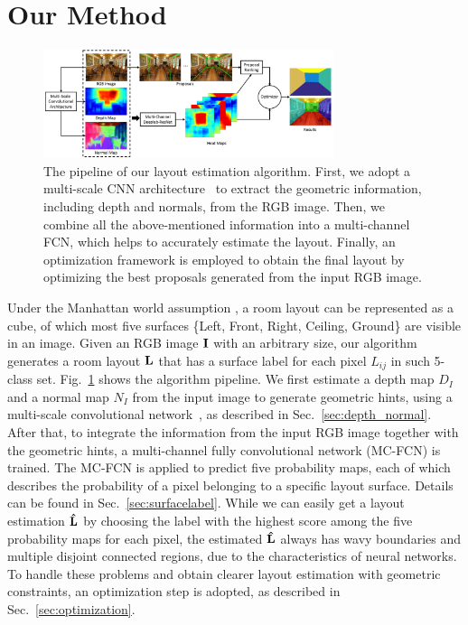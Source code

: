 \section{Our Method}
\label{sec:Meth}

 

\begin{figure}[!ht]
	\centering
	\includegraphics[width=8.5cm]{figure/ppline.png}
	\caption{The pipeline of our layout estimation algorithm. First, we adopt a multi-scale CNN architecture~\cite{eigen2015predicting} to extract the geometric information, including depth and normals, from the RGB image. Then, we combine all the above-mentioned information into a multi-channel FCN, which helps to accurately estimate the layout. Finally, an optimization framework is employed to obtain the final layout by optimizing the best proposals generated from the input RGB image.}
	\label{fig:pipeline}
\end{figure}

Under the Manhattan world assumption \cite{coughlan1999manhattan}, a room layout can be represented as a cube, of which most five surfaces \{Left, Front, Right, Ceiling, Ground\} are visible in an image. 
%
Given an RGB image $\mathbf{I}$ with an arbitrary size, our algorithm generates a room layout $\mathbf{L}$ that has a surface label for each pixel $L_{ij}$ in such 5-class set. Fig.~\ref{fig:pipeline} shows the algorithm pipeline. 
We first estimate a depth map $D_{I}$ and a normal map $N_{I}$ from the input image to generate geometric hints, using a multi-scale convolutional network~\cite{eigen2015predicting}, as described in Sec.~\ref{sec:depth_normal}.
After that, to integrate the information from the input RGB image together with the geometric hints, a multi-channel fully convolutional network (MC-FCN) is trained. 
The MC-FCN is applied to predict five probability maps, each of which describes the probability of a pixel belonging to a specific layout surface. Details can be found in Sec.~\ref{sec:surfacelabel}.
While we can easily get a layout estimation $\mathbf{\hat{L}}$ by choosing the label with the highest score among the five probability maps for each pixel, the estimated $\mathbf{\hat{L}}$ always has wavy boundaries and multiple disjoint connected regions, due to the characteristics of neural networks. 
To handle these problems and obtain clearer layout estimation with geometric constraints, an optimization step is adopted, as described in Sec.~\ref{sec:optimization}.  
 

